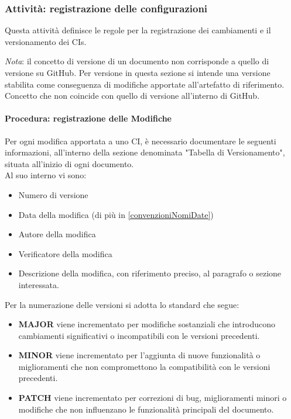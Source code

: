 \documentclass[a4paper,12pt]{article}
\begin{document}
\subsubsection{Attività: registrazione delle configurazioni} \label{versionamento_identificazione}
Questa attività definisce le regole per la registrazione dei cambiamenti e il
versionamento dei CIs.

\textit{Nota}: il concetto di versione di un documento non corrisponde a quello di versione su GitHub.
Per versione in questa sezione si intende una versione stabilita come conseguenza di modifiche apportate all'artefatto di riferimento. Concetto che non coincide con quello di versione all'interno di GitHub.

\paragraph{Procedura: registrazione delle Modifiche}\label{versione}
Per ogni modifica apportata a uno CI, è necessario documentare le seguenti
informazioni, all'interno della sezione denominata "Tabella di Versionamento",
situata all'inizio di ogni documento.\\Al suo interno vi sono:
\begin{itemize}
    \item Numero di versione
    \item Data della modifica (di più in \ref{convenzioniNomiDate})
    \item Autore della modifica
    \item Verificatore della modifica
    \item Descrizione della modifica, con riferimento preciso, al paragrafo o sezione
          interessata.
\end{itemize}
Per la numerazione delle versioni si adotta lo standard che segue:
\begin{itemize}
    \item \textbf{MAJOR} viene incrementato per modifiche sostanziali che introducono cambiamenti significativi o incompatibili con le versioni precedenti.
    \item \textbf{MINOR} viene incrementato per l'aggiunta di nuove funzionalità o miglioramenti che non compromettono la compatibilità con le versioni precedenti.
    \item \textbf{PATCH} viene incrementato per correzioni di bug, miglioramenti minori o modifiche che non influenzano le funzionalità principali del documento.
\end{itemize}
\end{document}
